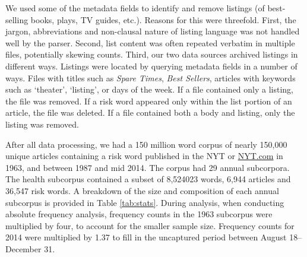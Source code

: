 We used some of the metadata fields to identify and remove listings (of best-selling books, plays, TV guides, etc.). Reasons for this were threefold. First, the jargon, abbreviations and non-clausal nature of listing language was not handled well by the parser. Second, list content was often repeated verbatim in multiple files, potentially skewing counts. Third, our two data sources archived listings in different ways. Listings were located by querying metadata fields in a number of ways. Files with titles such as \emph{Spare Times}, \emph{Best Sellers}, articles with keywords such as `theater', `listing', or days of the week. If a file contained only a listing, the file was removed. If a risk word appeared only within the list portion of an article, the file was deleted. If a file contained both a body and listing, only the listing was removed.

After all data processing, we had a 150 million word corpus of nearly 150,000 unique articles containing a risk word published in the NYT or \url{NYT.com} in 1963, and between 1987 and mid 2014. The corpus had 29 annual subcorpora. The health subcorpus contained a subset of 8,524023 words, 6,944 articles and 36,547 risk words. A breakdown of the size and composition of each annual subcorpus is provided in Table \ref{tab:stats}. During analysis, when conducting absolute frequency analysis, frequency counts in the 1963 subcorpus were multiplied by four, to account for the smaller sample size. Frequency counts for 2014 were multiplied by 1.37 to fill in the uncaptured period between August 18--December 31.

